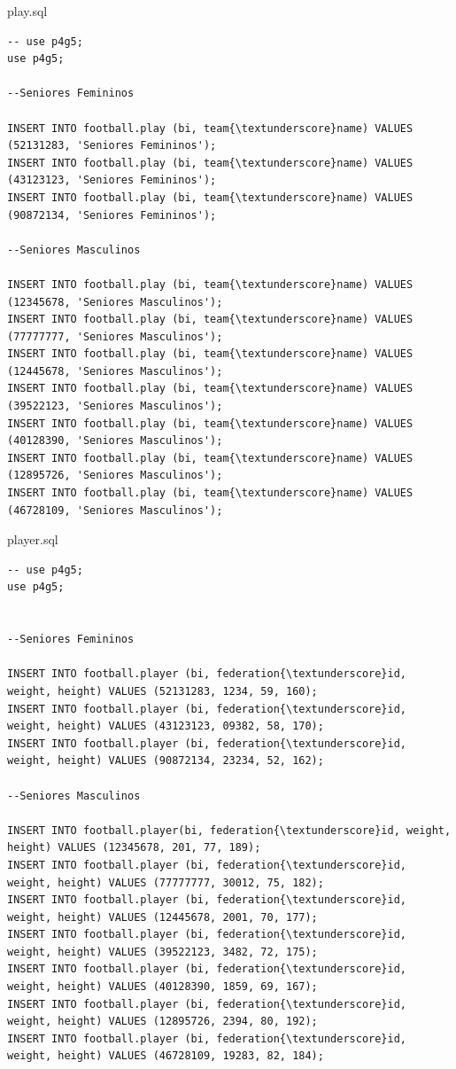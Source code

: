 \documentclass[pdftex,12pt,a4paper]{report}
\begin{document}
play.sql
\begin{lstlisting} 
-- use p4g5;
use p4g5;

--Seniores Femininos

INSERT INTO football.play (bi, team{\textunderscore}name) VALUES (52131283, 'Seniores Femininos');
INSERT INTO football.play (bi, team{\textunderscore}name) VALUES (43123123, 'Seniores Femininos');
INSERT INTO football.play (bi, team{\textunderscore}name) VALUES (90872134, 'Seniores Femininos');

--Seniores Masculinos

INSERT INTO football.play (bi, team{\textunderscore}name) VALUES (12345678, 'Seniores Masculinos');
INSERT INTO football.play (bi, team{\textunderscore}name) VALUES (77777777, 'Seniores Masculinos');
INSERT INTO football.play (bi, team{\textunderscore}name) VALUES (12445678, 'Seniores Masculinos');
INSERT INTO football.play (bi, team{\textunderscore}name) VALUES (39522123, 'Seniores Masculinos');
INSERT INTO football.play (bi, team{\textunderscore}name) VALUES (40128390, 'Seniores Masculinos');
INSERT INTO football.play (bi, team{\textunderscore}name) VALUES (12895726, 'Seniores Masculinos');
INSERT INTO football.play (bi, team{\textunderscore}name) VALUES (46728109, 'Seniores Masculinos');
\end{lstlisting}

player.sql
\begin{lstlisting} 
-- use p4g5;
use p4g5;


--Seniores Femininos

INSERT INTO football.player (bi, federation{\textunderscore}id, weight, height) VALUES (52131283, 1234, 59, 160);
INSERT INTO football.player (bi, federation{\textunderscore}id, weight, height) VALUES (43123123, 09382, 58, 170);
INSERT INTO football.player (bi, federation{\textunderscore}id, weight, height) VALUES (90872134, 23234, 52, 162);

--Seniores Masculinos

INSERT INTO football.player(bi, federation{\textunderscore}id, weight, height) VALUES (12345678, 201, 77, 189);
INSERT INTO football.player (bi, federation{\textunderscore}id, weight, height) VALUES (77777777, 30012, 75, 182);
INSERT INTO football.player (bi, federation{\textunderscore}id, weight, height) VALUES (12445678, 2001, 70, 177);
INSERT INTO football.player (bi, federation{\textunderscore}id, weight, height) VALUES (39522123, 3482, 72, 175);
INSERT INTO football.player (bi, federation{\textunderscore}id, weight, height) VALUES (40128390, 1859, 69, 167);
INSERT INTO football.player (bi, federation{\textunderscore}id, weight, height) VALUES (12895726, 2394, 80, 192);
INSERT INTO football.player (bi, federation{\textunderscore}id, weight, height) VALUES (46728109, 19283, 82, 184);




\end{lstlisting}
\end{document}
